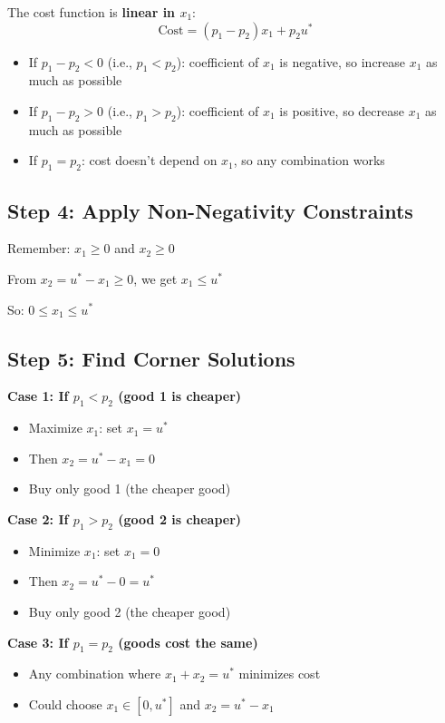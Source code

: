 \documentclass[11pt]{article}
\begin{document}
The cost function is \textbf{linear in $x_1$}:
\begin{equation}
\text{Cost} = (p_1 - p_2)x_1 + p_2 u^*
\end{equation}

\begin{itemize}
\item If $p_1 - p_2 < 0$ (i.e., $p_1 < p_2$): coefficient of $x_1$ is negative, so increase $x_1$ as much as possible
\item If $p_1 - p_2 > 0$ (i.e., $p_1 > p_2$): coefficient of $x_1$ is positive, so decrease $x_1$ as much as possible
\item If $p_1 = p_2$: cost doesn't depend on $x_1$, so any combination works
\end{itemize}

\subsection{Step 4: Apply Non-Negativity Constraints}

Remember: $x_1 \geq 0$ and $x_2 \geq 0$

From $x_2 = u^* - x_1 \geq 0$, we get $x_1 \leq u^*$

So: $0 \leq x_1 \leq u^*$

\subsection{Step 5: Find Corner Solutions}

\textbf{Case 1: If $p_1 < p_2$ (good 1 is cheaper)}
\begin{itemize}
\item Maximize $x_1$: set $x_1 = u^*$
\item Then $x_2 = u^* - x_1 = 0$
\item Buy only good 1 (the cheaper good)
\end{itemize}

\textbf{Case 2: If $p_1 > p_2$ (good 2 is cheaper)}
\begin{itemize}
\item Minimize $x_1$: set $x_1 = 0$
\item Then $x_2 = u^* - 0 = u^*$
\item Buy only good 2 (the cheaper good)
\end{itemize}

\textbf{Case 3: If $p_1 = p_2$ (goods cost the same)}
\begin{itemize}
\item Any combination where $x_1 + x_2 = u^*$ minimizes cost
\item Could choose $x_1 \in [0, u^*]$ and $x_2 = u^* - x_1$
\end{itemize}
\end{document}
